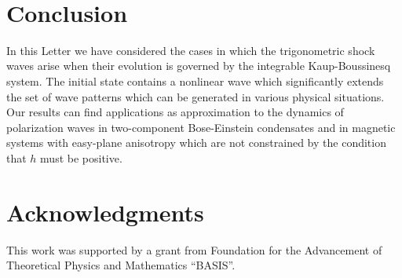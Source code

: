 \documentclass[pre,aps,superscriptaddress,twocolumn,floatfix]{revtex4-1}
\begin{document}
~

\section{Conclusion}

In this Letter we have considered the cases in which the trigonometric shock waves
arise when their evolution is governed by the integrable Kaup-Boussinesq system.
The initial state contains a nonlinear wave which significantly extends the set
of wave patterns which can be generated in various physical situations. Our results
can find applications as approximation to the dynamics of polarization waves in
two-component Bose-Einstein condensates and in magnetic systems with easy-plane
anisotropy which are not constrained by the condition that $h$ must be positive.


\section{Acknowledgments}

This work was supported by a grant from Foundation for the
Advancement of Theoretical Physics and Mathematics ``BASIS''.

	
	
\end{document}
